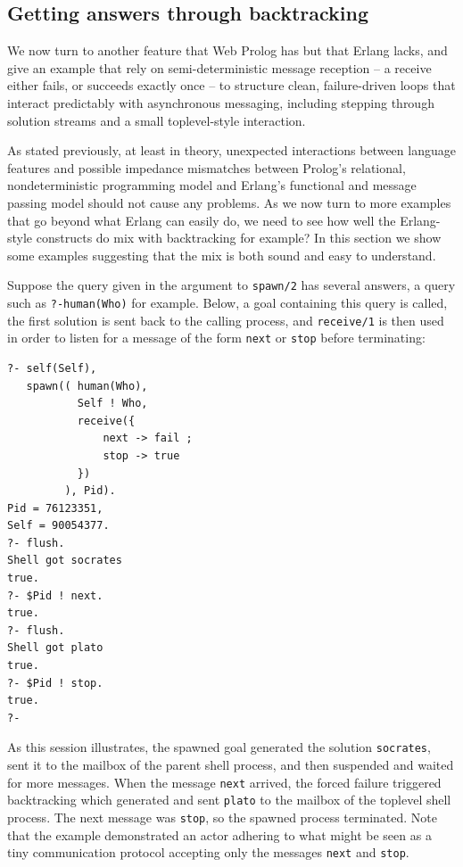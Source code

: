 \subsection{Getting answers through backtracking}\label{sec:answers-through-backtracking}

We now turn to another feature that Web Prolog has but that Erlang lacks, and give an example that rely on semi-deterministic message reception -- a receive either fails, or succeeds exactly once -- to structure clean, failure-driven loops that interact predictably with asynchronous messaging, including stepping through solution streams and a small toplevel-style interaction.

As stated previously, at least in theory, unexpected interactions between language features and possible impedance mismatches between Prolog's relational, nondeterministic programming model and Erlang's functional and message passing model should not cause any problems. As we now turn to more examples that go beyond what Erlang can easily do, we need to see how well the Erlang-style constructs do mix with backtracking for example? In this section we show some examples suggesting that the mix is both sound and easy to understand. 

Suppose the query given in the argument to \texttt{spawn/2} has several answers, a query such as \texttt{?-human(Who)} for example. Below, a goal containing this query is called, the first solution is sent back to the calling process, and \texttt{receive/1} is then used in order to listen for a message of the form \texttt{next} or \texttt{stop} before terminating:

\begin{verbatim}
?- self(Self),
   spawn(( human(Who),
           Self ! Who,
           receive({
               next -> fail ;
               stop -> true
           })
         ), Pid).
Pid = 76123351,
Self = 90054377.
?- flush.
Shell got socrates
true.
?- $Pid ! next.
true.
?- flush.
Shell got plato
true.
?- $Pid ! stop.
true.
?-
\end{verbatim}

\noindent As this session illustrates, the spawned goal generated the solution \texttt{socrates}, sent it to the mailbox of the parent shell process, and then suspended and waited for more messages. When the message \texttt{next} arrived, the forced failure triggered backtracking which generated and sent \texttt{plato} to the mailbox of the toplevel shell process. The next message was \texttt{stop}, so the spawned process terminated. 
Note that the example demonstrated an actor adhering to what might be seen as a tiny communication protocol accepting only the messages \texttt{next} and \texttt{stop}. 

